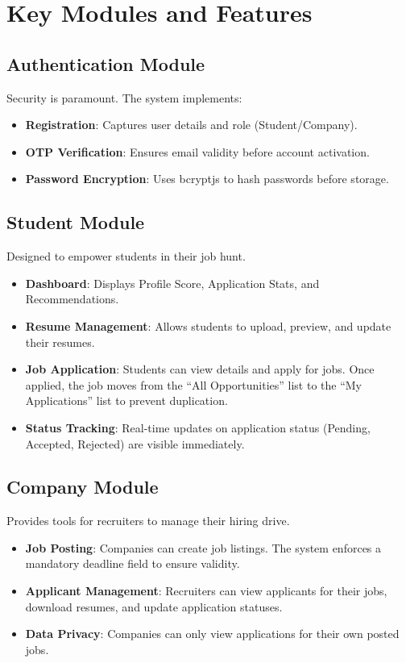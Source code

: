 \documentclass[conference]{IEEEtran}
\begin{document}
\section{Key Modules and Features}

\subsection{Authentication Module}
Security is paramount. The system implements:
\begin{itemize}
    \item \textbf{Registration}: Captures user details and role (Student/Company).
    \item \textbf{OTP Verification}: Ensures email validity before account activation.
    \item \textbf{Password Encryption}: Uses bcryptjs to hash passwords before storage.
\end{itemize}

\subsection{Student Module}
Designed to empower students in their job hunt.
\begin{itemize}
    \item \textbf{Dashboard}: Displays Profile Score, Application Stats, and Recommendations.
    \item \textbf{Resume Management}: Allows students to upload, preview, and update their resumes.
    \item \textbf{Job Application}: Students can view details and apply for jobs. Once applied, the job moves from the ``All Opportunities'' list to the ``My Applications'' list to prevent duplication.
    \item \textbf{Status Tracking}: Real-time updates on application status (Pending, Accepted, Rejected) are visible immediately.
\end{itemize}

\subsection{Company Module}
Provides tools for recruiters to manage their hiring drive.
\begin{itemize}
    \item \textbf{Job Posting}: Companies can create job listings. The system enforces a mandatory deadline field to ensure validity.
    \item \textbf{Applicant Management}: Recruiters can view applicants for their jobs, download resumes, and update application statuses.
    \item \textbf{Data Privacy}: Companies can only view applications for their own posted jobs.
\end{itemize}
\end{document}
